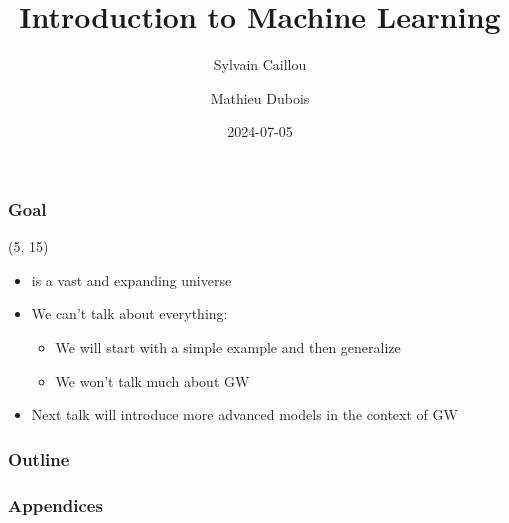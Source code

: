 \documentclass[10pt]{beamer}
\title{Introduction to Machine Learning}
\author{Sylvain Caillou \and Mathieu Dubois}
\institute{MaNiTou 2024}
\date{2024-07-05}
\begin{document}
\frame{\titlepage}


\begin{frame}
  \frametitle{Goal}

  \begin{textblock}{90}(5, 15)
    \begin{itemize}
    \item {} is a vast and expanding universe 
    \item<3-> We can't talk about everything:
      \begin{itemize}
      \item<4-> We will start with a simple example and then generalize
      \item<4-> We won't talk much about GW
      \end{itemize}
    \item<5-> Next talk will introduce more advanced models in the context of GW
    \end{itemize}
  \end{textblock}
\end{frame}


\begin{frame}
  \frametitle{Outline}
  \tableofcontents[hidesubsections]
\end{frame}





%







\appendix

\begin{frame}
  \frametitle{Appendices}
  \tableofcontents[hidesubsections]
\end{frame}






%
\end{document}
